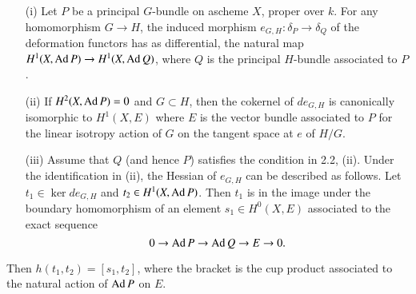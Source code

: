 \begin{subprop}\label{art05-prop2.12}
\begin{itemize}
\item[\rm(i)] Let $P$ be a principal $G$-bundle on a\break scheme $X$,
proper over $k$. For  any homomorphism $G\to H$, the induced morphism
$e_{G,H}:\delta_{P}\to \delta_{Q}$ of the deformation functors has as
differential, the natural map $H^{1}(X,\operatorname{Ad} P)\to H^{1}(X,\operatorname{Ad} Q)$,
where $Q$ is the principal $H$-bundle associated to $P$.

\item[\rm(ii)] If $H^{2}(X,\operatorname{Ad} P)=0$ and $G\subset H$, then the
cokernel of $de_{G,H}$ is canonically isomorphic to $H^{1}(X,E)$ where
$E$ is the vector bundle associated to $P$ for the linear isotropy
action of $G$ on the tangent space at $e$ of $H/G$.

\item[\rm(iii)] Assume that $Q$ (and hence $P$) satisfies the
condition in 2.2, {\rm (ii)}. Under the identification in {\rm(ii)},
the Hessian of $e_{G,H}$ can be described as follows. Let
$t_{1}\in \ker de_{G,H}$ and $t_{2}\in H^{1}(X,\operatorname{Ad} P)$. Then $t_{1}$
is in the image under the boundary homomorphism of an element
$s_{1}\in H^{0}(X,E)$ associated to the exact sequence
$$
0\to \operatorname{Ad} P\to \operatorname{Ad} Q\to E\to 0.
$$
\end{itemize}
Then $h(t_{1},t_{2})=[s_{1},t_{2}]$, where the bracket is the cup
product associated to the natural action of $\operatorname{Ad} P$ on $E$.
\end{subprop}

